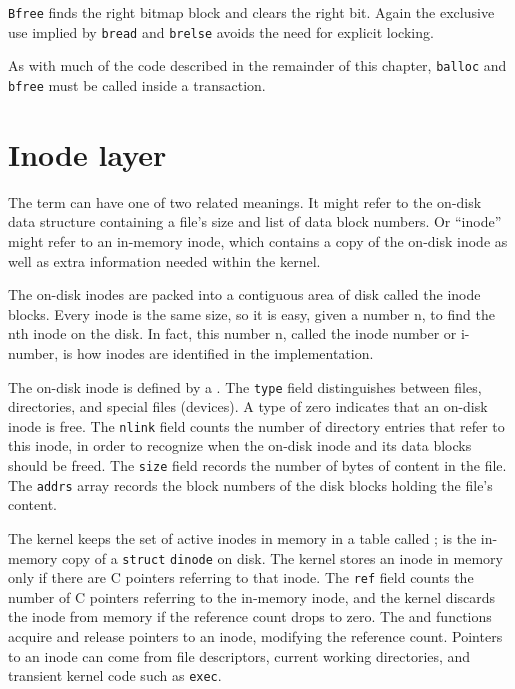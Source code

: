 \lstinline{Bfree}
finds the right bitmap block and clears the right bit.
Again the exclusive use implied by
\lstinline{bread}
and
\lstinline{brelse}
avoids the need for explicit locking.

As with much of the code described in the remainder of this chapter, 
\lstinline{balloc}
and
\lstinline{bfree}
must be called inside a transaction.
\section{Inode layer}

The term 
can have one of two related meanings.
It might refer to the on-disk data structure containing
a file's size and list of data block numbers.
Or ``inode'' might refer to an in-memory inode, which contains
a copy of the on-disk inode as well as extra information needed
within the kernel.

The on-disk inodes
are packed into a contiguous area
of disk called the inode blocks.
Every inode is the same size, so it is easy, given a
number n, to find the nth inode on the disk.
In fact, this number n, called the inode number or i-number,
is how inodes are identified in the implementation.

The on-disk inode is defined by a
.
The 
\lstinline{type}
field distinguishes between files, directories, and special
files (devices).
A type of zero indicates that an on-disk inode is free.
The
\lstinline{nlink}
field counts the number of directory entries that
refer to this inode, in order to recognize when the
on-disk inode and its data blocks should be freed.
The
\lstinline{size}
field records the number of bytes of content in the file.
The
\lstinline{addrs}
array records the block numbers of the disk blocks holding
the file's content.

The kernel keeps the set of active inodes in memory
in a table called ;
is the in-memory copy of a 
\lstinline{struct}
\lstinline{dinode}
on disk.
The kernel stores an inode in memory only if there are
C pointers referring to that inode. The
\lstinline{ref}
field counts the number of C pointers referring to the
in-memory inode, and the kernel discards the inode from
memory if the reference count drops to zero.
The
and
functions acquire and release pointers to an inode,
modifying the reference count.
Pointers to an inode can come from file descriptors,
current working directories, and transient kernel code
such as
\lstinline{exec}.

